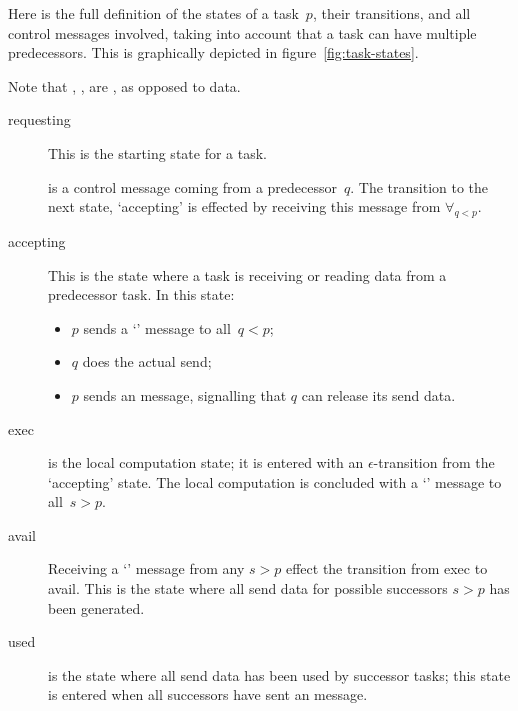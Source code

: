 Here is the full definition of the states of a task~$p$, their transitions,
and all control messages involved, taking into account that
a task can have multiple predecessors. This is graphically depicted
in figure~\ref{fig:task-states}.

Note that , , 
are , as opposed to data.

\def\ctrlmsg#1#2{%
  \bgroup\def\ctrlfr{#1}\def\ctrlto{#2}\catcode`\_=12\relax
  \def\ctrldisp{$\ctrlfr_{\mathrm\ctrlnm}(\ctrlto)$\egroup}%
  \afterassignment\ctrldisp\def\ctrlnm}
\begin{description}
  \item[requesting] This is the starting state for a task.
  \item[] is a control message coming from a predecessor~$q$.
    The transition to the next state, `accepting' is effected by 
    receiving this message from $\forall_{q<p}$.
  \item[accepting] This is the state where a task is receiving or
    reading data from a predecessor task. In this state:
    \begin{itemize}
    \item $p$ sends a `' message to all~$q<p$;
    \item $q$ does the actual send; 
    \item $p$ sends an  message, signalling that $q$ can 
      release its send data.
    \end{itemize}
  \item[exec] is the local computation state; it is entered with an
    $\epsilon$-transition from the `accepting' state. The local computation
    is concluded with a `' message to all~$s>p$.
  \item[avail] Receiving a `' message from any $s>p$
    effect the transition from exec to avail. This is the state where
    all send data for possible successors $s>p$ has been
    generated.
  \item[used] is the state where all send data has been used by
    successor tasks; this state is entered when all successors have
    sent an  message.
\end{description}

